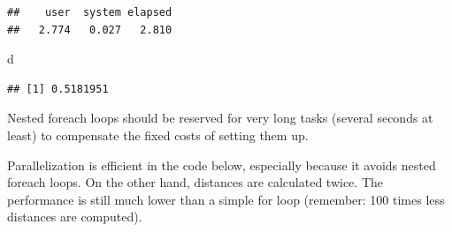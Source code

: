 \documentclass[
  12pt,
  american,
  a4paper,
  extrafontsizes,onecolumn,openright
  ]{memoir}
\newenvironment{Shaded}{\begin{snugshade}}{\end{snugshade}}
\newcommand{\AttributeTok}[1]{\textcolor[rgb]{0.77,0.63,0.00}{#1}}
\newcommand{\ControlFlowTok}[1]{\textcolor[rgb]{0.13,0.29,0.53}{\textbf{#1}}}
\newcommand{\DecValTok}[1]{\textcolor[rgb]{0.00,0.00,0.81}{#1}}
\newcommand{\FunctionTok}[1]{\textcolor[rgb]{0.00,0.00,0.00}{#1}}
\newcommand{\NormalTok}[1]{#1}
\newcommand{\OtherTok}[1]{\textcolor[rgb]{0.56,0.35,0.01}{#1}}
\newcommand{\SpecialCharTok}[1]{\textcolor[rgb]{0.00,0.00,0.00}{#1}}
\newcommand{\StringTok}[1]{\textcolor[rgb]{0.31,0.60,0.02}{#1}}
\newlength{\rf}
\begin{document}
\begin{verbatim}
##    user  system elapsed 
##   2.774   0.027   2.810
\end{verbatim}

\begin{Shaded}
\begin{Highlighting}[]
\NormalTok{d}
\end{Highlighting}
\end{Shaded}

\begin{verbatim}
## [1] 0.5181951
\end{verbatim}

\normalsize

Nested foreach loops should be reserved for very long tasks (several seconds at least) to compensate the fixed costs of setting them up.

Parallelization is efficient in the code below, especially because it avoids nested foreach loops.
On the other hand, distances are calculated twice.
The performance is still much lower than a simple for loop (remember: 100 times less distances are computed).

\scriptsize

\begin{Shaded}
\end{Shaded}
\end{document}
